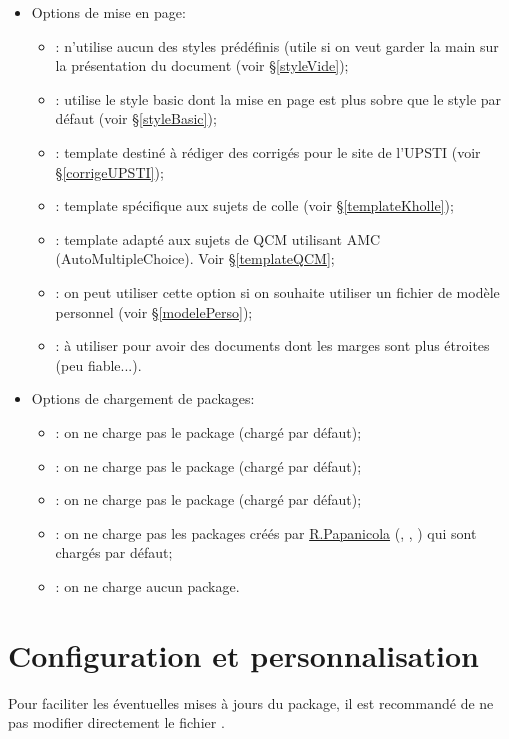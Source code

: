 \documentclass[11pt]{article}
\begin{document}
\begin{itemize}
\item Options de mise en page: 
\begin{itemize}
\item {}: n'utilise aucun des styles prédéfinis (utile si on veut garder la main sur la présentation du document (voir \S \ref{styleVide});
\item {}: utilise le style \og basic\fg{} dont la mise en page est plus sobre que le style par défaut (voir \S \ref{styleBasic});
\item {}: template destiné à rédiger des corrigés pour le site de l'UPSTI (voir \S \ref{corrigeUPSTI});
\item {}: template spécifique aux sujets de colle (voir \S \ref{templateKholle});
\item {}: template adapté aux sujets de QCM utilisant AMC (AutoMultipleChoice). Voir \S \ref{templateQCM};
\item {}: on peut utiliser cette option si on souhaite utiliser un fichier de modèle personnel (voir \S \ref{modelePerso});
\item {}: à utiliser pour avoir des documents dont les marges sont plus étroites (peu fiable...).
\end{itemize}
\item Options de chargement de packages:
\begin{itemize}
\item {}: on ne charge pas le package  (chargé par défaut);
\item {}: on ne charge pas le package  (chargé par défaut);
\item {}: on ne charge pas le package  (chargé par défaut);
\item {}: on ne charge pas les packages créés par \textcolor{UPSTIcustomColor1}{\href{http://sciences-indus-cpge.papanicola.info/}{R.Papanicola}} (, , ) qui sont chargés par défaut;
\item {}: on ne charge aucun package.
\end{itemize}
\end{itemize}

\section{Configuration et personnalisation\label{custom}}
Pour faciliter les éventuelles mises à jours du package, il est recommandé de ne pas modifier directement le fichier .
\end{document}
